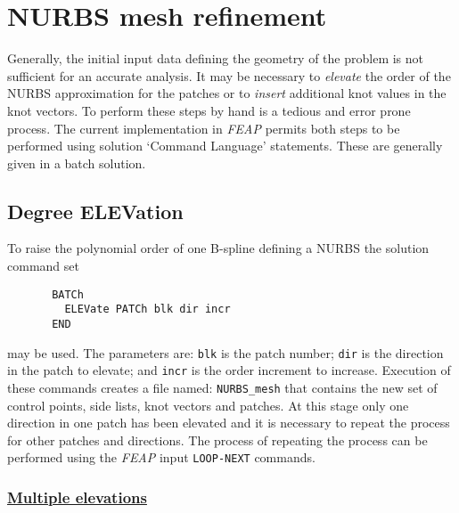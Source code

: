 \section{NURBS mesh refinement}

Generally, the initial input data defining the geometry of the problem is not
sufficient for an accurate analysis.  It may be necessary to \textit{elevate}
the order of the NURBS approximation for the patches or to \textit{insert}
additional knot values in the knot vectors.  To perform these steps by hand
is a tedious and error prone process.  The current implementation in
\textsl{FEAP} permits both steps to be performed using solution `Command
Language' statements.
These are generally given in a batch solution.

\subsection{Degree ELEVation}

To raise the polynomial order of one B-spline defining a NURBS the
solution command set
\begin{verbatim}
       BATCh
         ELEVate PATCh blk dir incr
       END
\end{verbatim}
may be used.  The parameters are: \texttt{blk} is the patch number;
\texttt{dir} is the direction in the patch to elevate; and \texttt{incr} is
the order increment to increase.  Execution of these commands creates a
file named: \texttt{NURBS\_mesh} that contains the new set of control points,
side lists, knot vectors and patches.  At this stage only one direction
in one patch has been elevated and it is necessary to repeat the process for
other patches and directions.  The process of repeating the process can be
performed using the \textsl{FEAP} input \texttt{LOOP-NEXT} commands.

\subsubsection{\ul{Multiple elevations}}


